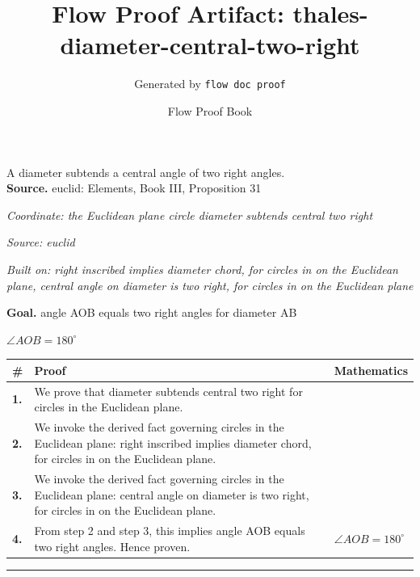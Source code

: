 \documentclass[11pt]{article}
\title{Flow Proof Artifact: thales-diameter-central-two-right}
\author{Generated by \texttt{flow doc proof}}
\date{Flow Proof Book}
\theoremstyle{definition}
\begin{document}
\maketitle
A diameter subtends a central angle of two right angles.\\[0.5em]
\textbf{Source.} euclid: Elements, Book III, Proposition 31\\[0.5em]
\bigskip
{}\par
\smallskip\noindent\textit{Coordinate: the Euclidean plane \cdot circle \cdot diameter subtends central two right}\par
\smallskip\noindent\textit{Source: euclid}\par
\smallskip\noindent\textit{Built on: right inscribed implies diameter chord, for circles in on the Euclidean plane, central angle on diameter is two right, for circles in on the Euclidean plane}\par
\medskip
\noindent\textbf{Goal.} angle AOB equals two right angles for diameter AB\par
\noindent$\displaystyle \angle AOB = 180^\circ$\par
\medskip
\noindent
\begin{tabular}{@{} >{\raggedright\arraybackslash}p{} >{\raggedright\arraybackslash}p{} >{\raggedleft\arraybackslash}p{} @{}}
\textbf{\#} & \textbf{Proof} & \textbf{Mathematics} \\
\midrule
\textbf{1.} & We prove that diameter subtends central two right for circles in the Euclidean plane. & \\[0.45em]
\textbf{2.} & We invoke the derived fact governing circles in the Euclidean plane: right inscribed implies diameter chord, for circles in on the Euclidean plane. & \\[0.45em]
\textbf{3.} & We invoke the derived fact governing circles in the Euclidean plane: central angle on diameter is two right, for circles in on the Euclidean plane. & \\[0.45em]
\textbf{4.} & From step 2 and step 3, this implies angle AOB equals two right angles. Hence proven. & $\displaystyle \angle AOB = 180^\circ$ \\[0.45em]
\bottomrule
\end{tabular}
\label{thm:Geometry-circle-diameter_subtends_central_two_right}
\par\medskip\hrule
\end{document}

